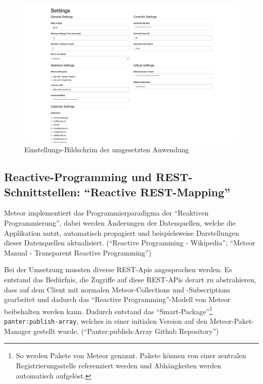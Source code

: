 \documentclass[]{article}
\begin{document}
\begin{figure}[htbp]
\centering
\includegraphics{../img/settingsscreen.png}
\caption{Einstellungs-Bildschrim der umgesetzten
Anwendung\label{figSettingsScreen}}
\end{figure}

\subsection{\texorpdfstring{Reactive-Programming und
REST-Schnittstellen: ``Reactive
REST-Mapping''}{Reactive-Programming und REST-Schnittstellen: Reactive REST-Mapping}}\label{reactive-programming-und-rest-schnittstellen-reactive-rest-mapping}

Meteor implementiert das Programmierparadigma der ``Reaktiven
Programmierung'', dabei werden Änderungen der Datenquellen, welche die
Applikation nutzt, automatisch propagiert und beispielsweise
Darstellungen dieser Datenquellen aktualisiert. (``Reactive Programming
- Wikipedia''; ``Meteor Manual - Transparent Reactive Programming'')

Bei der Umsetzung mussten diverse REST-Apis angesprochen werden. Es
entstand das Bedürfnis, die Zugriffe auf diese REST-APis derart zu
abstrahieren, dass auf dem Client mit normalen Meteor-Collections und
-Subscriptions gearbeitet und dadurch das ``Reactive
Programming''-Modell von Meteor beibehalten werden kann. Dadurch
entstand das ``Smart-Package''\footnote{So werden Pakete von Meteor
  genannt. Pakete können von einer zentralen Registrierungsstelle
  referenziert werden und Abhängkeiten werden automatisch aufgelöst.}
\lstinline!panter:publish-array!, welches in einer initialen Version auf
den Meteor-Paket-Manager gestellt wurde. (``Panter:publish-Array Github
Repository'')
\end{document}

